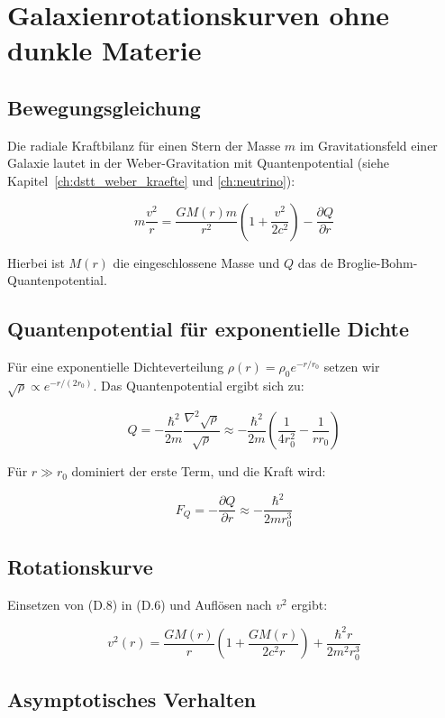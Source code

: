 \section{Galaxienrotationskurven ohne dunkle Materie}
\label{app:herleitungen_rotation}

\subsection{Bewegungsgleichung}
\label{sub:herleitungen_rot_bewegung}

Die radiale Kraftbilanz für einen Stern der Masse \( m \) im Gravitationsfeld einer Galaxie lautet in der Weber-Gravitation mit Quantenpotential (siehe Kapitel~\ref{ch:dstt_weber_kraefte} und \ref{ch:neutrino}):

\[
m\frac{v^2}{r} = \frac{GM(r)m}{r^2}\left(1 + \frac{v^2}{2c^2}\right) - \frac{\partial Q}{\partial r} \tag{D.6}
\]

Hierbei ist \( M(r) \) die eingeschlossene Masse und \( Q \) das de Broglie-Bohm-Quantenpotential.

\subsection{Quantenpotential für exponentielle Dichte}
\label{sub:herleitungen_rot_q}

Für eine exponentielle Dichteverteilung \( \rho(r) = \rho_0 e^{-r/r_0} \) setzen wir \( \sqrt{\rho} \propto e^{-r/(2r_0)} \). Das Quantenpotential ergibt sich zu:

\[
Q = -\frac{\hbar^2}{2m} \frac{\nabla^2 \sqrt{\rho}}{\sqrt{\rho}} \approx -\frac{\hbar^2}{2m} \left( \frac{1}{4r_0^2} - \frac{1}{r r_0} \right) \tag{D.7}
\]

Für \( r \gg r_0 \) dominiert der erste Term, und die Kraft wird:

\[
F_Q = -\frac{\partial Q}{\partial r} \approx -\frac{\hbar^2}{2m r_0^3} \tag{D.8}
\]

\subsection{Rotationskurve}
\label{sub:herleitungen_rot_kurve}

Einsetzen von (D.8) in (D.6) und Auflösen nach \( v^2 \) ergibt:

\[
v^2(r) = \frac{GM(r)}{r} \left(1 + \frac{GM(r)}{2c^2 r}\right) + \frac{\hbar^2 r}{2m^2 r_0^3} \tag{D.9}
\]

\subsection{Asymptotisches Verhalten}
\label{sub:herleitungen_rot_asymptote}

